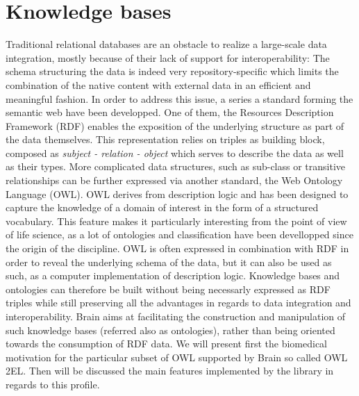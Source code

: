 \documentclass{bioinfo}
\begin{document}
\section{Knowledge bases}
Traditional relational databases are an obstacle to realize a large-scale data integration, mostly because of their lack of support for 
interoperability: The schema structuring the data is indeed very repository-specific which limits the combination of the 
native content with external data in an efficient and meaningful fashion. In order to address this issue, 
a series a standard forming the semantic web have been developped. One of them, the Resources Description 
Framework (RDF) enables the exposition of the underlying structure as part of the data themselves. This
representation relies on triples as building block, composed as \emph{subject - relation - object} which serves to
describe the data as well as their types. More complicated data structures, such as sub-class or
transitive relationships can be further expressed via another standard, the Web Ontology Language (OWL). OWL derives from description logic and
has been designed to capture the knowledge of a domain of interest in the form of a structured vocabulary. This feature makes it particularly 
interesting from the point of view of life science, as a lot of ontologies and classification have been devellopped since the origin of 
the discipline. OWL is often expressed in combination with RDF in order to reveal the underlying schema of the data, but 
it can also be used as such, as a computer implementation of description logic. 
Knowledge bases and ontologies can therefore be built without being necessarly expressed as RDF triples while still preserving all the 
advantages in regards to data integration and interoperability.
Brain aims at facilitating the construction and manipulation of 
such knowledge bases (referred also as ontologies), rather than being oriented towards the consumption of RDF data. 
We will present first the biomedical motivation for the particular subset of OWL supported by Brain so called OWL 2EL. 
Then will be discussed the main features implemented by the library in regards to this profile.
\end{document}
